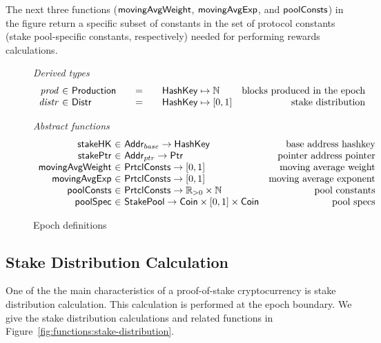 The next three functions ($\mathsf{movingAvgWeight}$, $\mathsf{movingAvgExp}$, and
$\mathsf{poolConsts}$) in the figure return a specific subset of constants
in the set of protocol constants (stake pool-specific constants, respectively)
needed for performing rewards calculations.

\begin{figure}[htb]
  \emph{Derived types}
  \begin{equation*}
    \begin{array}{r@{~\in~}l@{\qquad=\qquad}lr}
      \var{prod}
      & \Production
      & \HashKey \mapsto \mathbb{N}
      & \text{blocks produced in the epoch} \\
      \var{distr}
      & \Distr
      & \HashKey \mapsto [0,1]
      & \text{stake distribution} \\
    \end{array}
  \end{equation*}


  \emph{Abstract functions}
  \begin{equation*}
    \begin{array}{r@{~\in~}lr}
      \fun{stakeHK} & \Addr_{base} \to \HashKey
      & \text{base address hashkey}\\
      \fun{stakePtr} & \Addr_{ptr} \to \Ptr
      & \text{pointer address pointer}\\
      \fun{movingAvgWeight} & \PrtclConsts \to [0, 1]
      & \text{moving average weight}\\
      \fun{movingAvgExp} & \PrtclConsts \to [0, 1]
      & \text{moving average exponent}\\
      \fun{poolConsts} & \PrtclConsts \to \mathbb{R}_{>0}\times\mathbb{N}
      & \text{pool constants}\\
      \fun{poolSpec} & \StakePool \to \Coin\times [0,1] \times \Coin
      & \text{pool specs}\\
    \end{array}
  \end{equation*}
  \caption{Epoch definitions}
  \label{fig:epoch-defs}
\end{figure}

\subsection{Stake Distribution Calculation}
\label{sec:stake-dist}

One of the the main characteristics of a proof-of-stake cryptocurrency is stake
distribution calculation. This calculation is performed at the epoch boundary.
We give the stake distribution calculations and related functions in
Figure~\ref{fig:functions:stake-distribution}.

